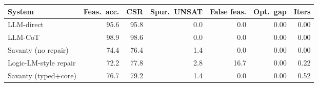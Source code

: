 \begin{tabular}{lrrrrrr}
\toprule
System & Feas.\ acc. & CSR & Spur.\ UNSAT & False feas. & Opt.\ gap & Iters \\
\midrule
LLM-direct & 95.6 & 95.8 & 0.0 & 0.0 & 0.00 & 0.00 \\
LLM-CoT & 98.9 & 98.6 & 0.0 & 0.0 & 0.00 & 0.00 \\
Savanty (no repair) & 74.4 & 76.4 & 1.4 & 0.0 & 0.00 & 0.00 \\
Logic-LM-style repair & 72.2 & 77.8 & 2.8 & 16.7 & 0.00 & 0.22 \\
Savanty (typed+core) & 76.7 & 79.2 & 1.4 & 0.0 & 0.00 & 0.52 \\
\bottomrule
\end{tabular}
